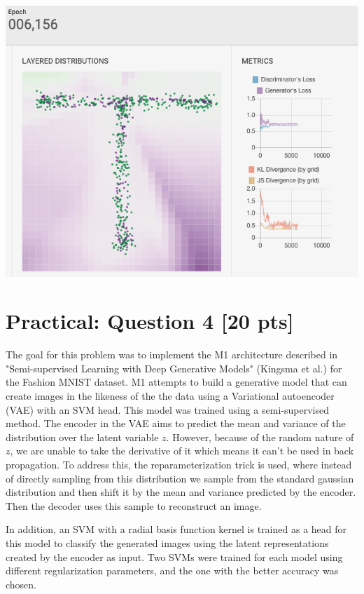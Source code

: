 \documentclass{article}
\begin{document}
\includegraphics[scale=.5]{../src/gan_lab.png}

\section{Practical: Question 4 [20 pts]}

The goal for this problem was to implement the M1 architecture described in "Semi-supervised Learning with Deep Generative Models" (Kingsma et al.) for the Fashion MNIST dataset.
M1 attempts to build a generative model that can create images in the likeness of the the data using a Variational autoencoder (VAE) with an SVM head. This model was trained using a 
semi-supervised method. The encoder in the VAE aims to predict the mean and variance of the distribution over the latent variable $z$. However, because of the random nature of $z$,
we are unable to take the derivative of it which means it can't be used in back propagation. To address this, the reparameterization trick is used, where instead of directly sampling from this distribution
we sample from the standard gaussian distribution and then shift it by the mean and variance predicted by the encoder. Then the decoder uses this sample to reconstruct an image. 

In addition, an SVM with a radial basis function kernel is trained as a head for this model to classify the generated images using the latent representations created by the encoder as input. Two SVMs were trained for each model using different regularization parameters,
and the one with the better accuracy was chosen.
\end{document}
